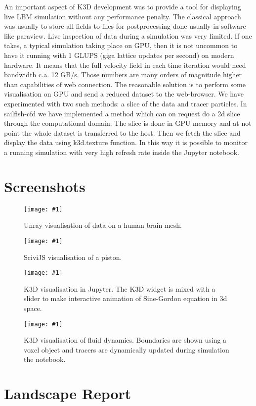 \documentclass{deliverablereport}
\newcommand{\screenshot}[2]{
\begin{figure}[ht]
  \texttt{[image: \#1]}
  \caption{#2}
\end{figure}}
\begin{document}
An important aspect of K3D development was to provide a tool for
displaying live LBM simulation without any performance penalty. The
classical approach was usually to store all fields to files for
postprocessing done usually in software like paraview. Live inspection
of data during a simulation was very limited.  If one takes, a typical
simulation taking place on GPU, then it is not uncommon to have it
running with 1 GLUPS (giga lattice updates per second) on modern
hardware. It means that the full velocity field in each time iteration
would need bandwidth c.a. 12 GB/s. Those numbers are many orders of
magnitude higher than capabilities of web connection.  The reasonable
solution is to perform some visualisation on GPU and send a reduced
dataset to the web-browser. We have experimented with two such
methods: a slice of the data and tracer particles. In sailfish-cfd we
have implemented a method which can on request do a 2d slice through
the computational domain. The slice is done in GPU memory and at not
point the whole dataset is transferred to the host. Then we fetch the
slice and display the data using k3d.texture function. In this way it
is possible to monitor a running simulation with very high refresh
rate inside the Jupyter notebook.







\clearpage
\appendix
\section{Screenshots}\label{screenshots}

\screenshot{unray-brain.png}{Unray visualisation of data on a human brain mesh.}
\screenshot{scivijs.png}{SciviJS visualisation of a piston.}

\screenshot{k3d_3.png}{K3D visualisation in Jupyter. The K3D widget is
  mixed with a slider to make interactive animation of Sine-Gordon
  equation in 3d space.}

\screenshot{k3d_cfd2.png}{K3D visualisation of fluid
  dynamics. Boundaries are shown using a voxel object and tracers are
  dynamically updated during simulation the notebook.}


\clearpage
\section{Landscape Report}\label{landscape}

\end{document}
